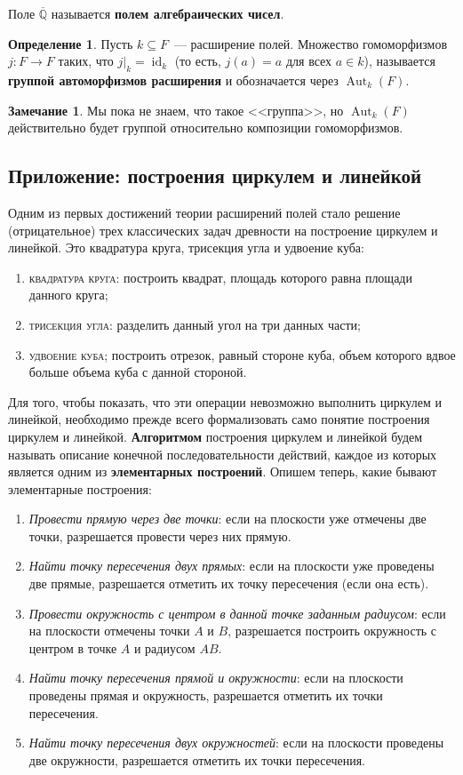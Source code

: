 \documentclass[a4paper,11pt]{scrartcl}
\theoremstyle{plain}
\theoremstyle{definition}
\newtheorem{definition}[theorem]{Определение}
\newtheorem{remark}[theorem]{Замечание}
\newcommand\dfn[1]{\textbf{#1}}
\newcommand\mb{\mathbb}
\newcommand\sseq{\subseteq}
\newcommand\id{\operatorname{id}}
\newcommand\Aut{\operatorname{Aut}}
\begin{document}
Поле $\overline{\mb Q}$ называется \dfn{полем алгебраических чисел}.

\begin{definition}
Пусть $k\sseq F$~--- расширение полей. Множество гомоморфизмов
$j\colon F\to F$ таких, что $j|_k=\id_k$ (то есть, $j(a)=a$ для всех
$a\in k$), называется \dfn{группой автоморфизмов расширения} и
обозначается через $\Aut_k(F)$.
\end{definition}
\begin{remark}
Мы пока не знаем, что такое <<группа>>, но $\Aut_k(F)$ действительно
будет группой относительно композиции гомоморфизмов.
\end{remark}


\subsection{Приложение: построения циркулем и линейкой}\label{ssect:constructions}

Одним из первых достижений теории расширений полей стало решение
(отрицательное) трех классических задач древности на построение
циркулем и линейкой. Это квадратура круга, трисекция угла и удвоение
куба:
\begin{enumerate}
\item \textsc{квадратура круга}: построить квадрат, площадь которого
  равна площади данного круга;
\item \textsc{трисекция угла}: разделить данный угол на три данных части;
\item \textsc{удвоение куба}; построить отрезок, равный стороне куба,
  объем которого вдвое больше объема куба с данной стороной.
\end{enumerate}
Для того, чтобы показать, что эти операции невозможно выполнить
циркулем и линейкой, необходимо прежде всего формализовать само
понятие построения циркулем и линейкой. \dfn{Алгоритмом} построения
циркулем
и линейкой будем называть описание конечной последовательности
действий, каждое из которых является одним из \dfn{элементарных
  построений}. Опишем теперь, какие бывают элементарные построения:
\begin{enumerate}
\item \emph{Провести прямую через две точки}: если на плоскости уже
  отмечены две точки, разрешается провести через них прямую.
\item \emph{Найти точку пересечения двух прямых}: если на плоскости уже
  проведены две прямые, разрешается отметить их точку пересечения
  (если она есть).
\item \emph{Провести окружность с центром в данной точке заданным
    радиусом}: если на плоскости отмечены точки $A$ и $B$, разрешается
  построить окружность с центром в точке $A$ и радиусом $AB$.
\item \emph{Найти точку пересечения прямой и окружности}: если на
  плоскости проведены прямая и окружность, разрешается отметить их
  точки пересечения.
\item \emph{Найти точку пересечения двух окружностей}: если на
  плоскости проведены две окружности, разрешается отметить их точки
  пересечения.
\end{enumerate}
\end{document}
